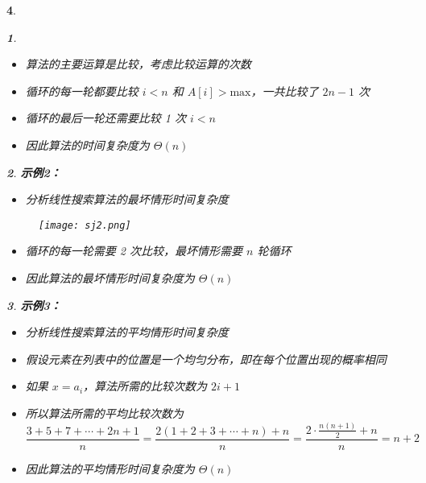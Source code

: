 \documentclass[UTF8]{report}
\theoremstyle{MyLineTheoremStyle} %
\theoremstyle{MyBlockTheoremStyle} %
\theoremstyle{MySubsubsectionStyle} %
\newtheorem{definition}{}
\begin{document}
\begin{definition}
\begin{definition}
    \begin{itemize}
        \item 算法的主要运算是比较，考虑比较运算的次数
        \item 循环的每一轮都要比较 $i < n$ 和 $A[i] > \text{max}$，一共比较了 $2n - 1$ 次
        \item 循环的最后一轮还需要比较 1 次 $i < n$
        \item 因此算法的时间复杂度为 $\Theta(n)$
    \end{itemize}
\end{definition}

\begin{definition}
    \textbf{示例2：}
    \begin{itemize}
        \item 分析线性搜索算法的最坏情形时间复杂度
    \end{itemize}

    \begin{figure}[ht]
        \centering
        \texttt{[image: sj2.png]}
    \end{figure}

    \begin{itemize}
        \item 循环的每一轮需要 2 次比较，最坏情形需要 $n$ 轮循环
        \item 因此算法的最坏情形时间复杂度为 $\Theta(n)$
    \end{itemize}
\end{definition}

\begin{definition}
    \textbf{示例3：}
    \begin{itemize}
        \item 分析线性搜索算法的平均情形时间复杂度
        \item 假设元素在列表中的位置是一个均匀分布，即在每个位置出现的概率相同
        \item 如果 $x = a_i$，算法所需的比较次数为 $2i + 1$
        \item 所以算法所需的平均比较次数为
        \[
        \frac{3 + 5 + 7 + \cdots + 2n + 1}{n} = \frac{2(1 + 2 + 3 + \cdots + n) + n}{n} = \frac{2 \cdot \frac{n(n + 1)}{2} + n}{n} = n + 2
        \]
        \item 因此算法的平均情形时间复杂度为 $\Theta(n)$
    \end{itemize}
\end{definition}


\end{definition}
\end{document}
